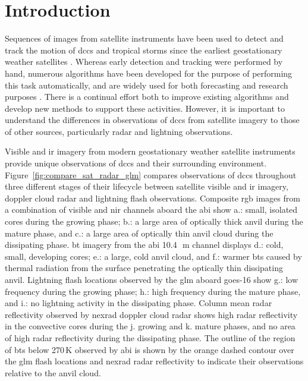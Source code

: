 
\section{Introduction} %


Sequences of images from satellite instruments have been used to detect and track the motion of \acrshort{dcc}s and tropical storms since the earliest geostationary weather satellites \citep{menzel_cloud_2001}.
Whereas early detection and tracking were performed by hand, numerous algorithms have been developed for the purpose of performing this task automatically, and are widely used for both forecasting and research purposes \citep[e.g.][]{mecikalski_use_2011, senf_characterization_2015, senf_satellite-based_2017, feng_life_2012, feng_spatiotemporal_2019, zinner_cb-tram_2008}.
There is a continual effort both to improve existing algorithms and develop new methods to support these activities.
However, it is important to understand the differences in observations of \acrshort{dcc}s from satellite imagery to those of other sources, particularly radar and lightning observations.

Visible and \acrshort{ir} imagery from modern geostationary weather satellite instruments provide unique observations of \acrshort{dcc}s and their surrounding environment.
Figure~\ref{fig:compare_sat_radar_glm} compares observations of \acrshort{dcc}s throughout three different stages of their lifecycle between satellite visible and \acrshort{ir} imagery, doppler cloud radar and lightning flash observations.
Composite \acrfull{rgb} images from a combination of visible and \acrshort{nir} channels aboard the \acrshort{abi} show a.: small, isolated cores during the growing phase; b.: a large area of optically thick anvil during the mature phase, and c.: a large area of optically thin anvil cloud during the dissipating phase.
\acrshort{bt} imagery from the \acrshort{abi} 10.4\,\unit{\mu m} channel displays d.: cold, small, developing cores; e.: a large, cold anvil cloud, and f.: warmer \acrshort{bt}s caused by thermal radiation from the surface penetrating the optically thin dissipating anvil. 
Lightning flash locations observed by the \acrfull{glm} aboard \acrshort{goes}-16 show g.: low frequency during the growing phase; h.: high frequency during the mature phase, and i.: no lightning activity in the dissipating phase. 
Column mean radar reflectivity observed by \acrfull{nexrad} doppler cloud radar shows high radar reflectivity in the convective cores during the j. growing and k. mature phases, and no area of high radar reflectivity during the dissipating phase. 
The outline of the region of \acrshort{bt}s below 270\,\unit{K} observed by \acrshort{abi} is shown by the orange dashed contour over the \acrshort{glm} flash locations and \acrshort{nexrad} radar reflectivity to indicate their observations relative to the anvil cloud.


